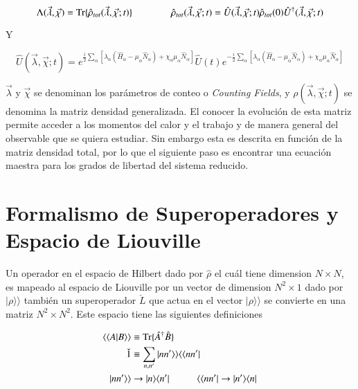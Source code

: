 \begin{equation}
    \Lambda(\vec{\lambda},\vec{\chi}) = \text{Tr}\{\hat{\rho}_{tot}(\vec{\lambda},\vec{\chi};t) \}    \hspace{14mm} \hat{\rho}_{tot}(\vec{\lambda},\vec{\chi};t) = \hat{U}(\vec{\lambda},\vec{\chi};t) \hat{\rho}_{tot}(0) \hat{U}^{\dagger}(\vec{\lambda},\vec{\chi};t)
    \label{sec2:evolucionconteo}
\end{equation}

Y 

\begin{equation*}
    \hat{U}(\vec{\lambda},\vec{\chi};t) = e^{\frac{i}{2}\sum_{\alpha}[\lambda_{\alpha}(\hat{H}_{\alpha} - \mu_{\alpha}\hat{N}_{\alpha} ) + \chi_{\alpha}\mu_{\alpha}\hat{N}_{\alpha} ]  } \hat{U}(t) e^{-\frac{i}{2}\sum_{\alpha}[ \lambda_{\alpha}(\hat{H}_{\alpha} - \mu_{\alpha}\hat{N}_{\alpha}) + \chi_{\alpha}\mu_{\alpha}\hat{N}_{\alpha} ]}
\end{equation*}

$\vec{\lambda}$ y $\vec{\chi}$ se denominan los parámetros de conteo o \textit{Counting Fields}, y $\rho(\vec{\lambda},\vec{\chi};t)$ se denomina la matriz densidad generalizada. El conocer la evolución de esta matriz permite acceder a los momentos del calor y el trabajo y de manera general del observable que se quiera estudiar. Sin embargo esta es descrita en función de la matriz densidad total, por lo que el siguiente paso es encontrar una ecuación maestra para los grados de libertad del sistema reducido.

\label{sec2:estadistica2puntos}



\section{Formalismo de Superoperadores y Espacio de Liouville}
Un operador en el espacio de Hilbert dado por $\hat{\rho}$ el cuál tiene dimension $N\times N$, es mapeado al espacio de Liouville por un vector de dimension $N^{2}\times 1$ dado por $|\rho \rangle \rangle$  también un superoperador $\check{L}$ que actua en el vector $|\rho\rangle \rangle$ se convierte en una matriz $N^{2}\times N^{2}$. Este espacio tiene las siguientes definiciones

\begin{align*}
    \langle \langle A|B\rangle \rangle  &\equiv \text{Tr}\{\hat{A}^{\dagger}\hat{B}\} \\
   \check{1}  &\equiv \sum_{n,n'}|nn'\rangle \rangle \langle \langle nn'| \\
     |nn'\rangle \rangle &  \to |n\rangle \langle n'|  \hspace{10mm}  \langle \langle nn'| \to |n'\rangle \langle n|     
\end{align*}

